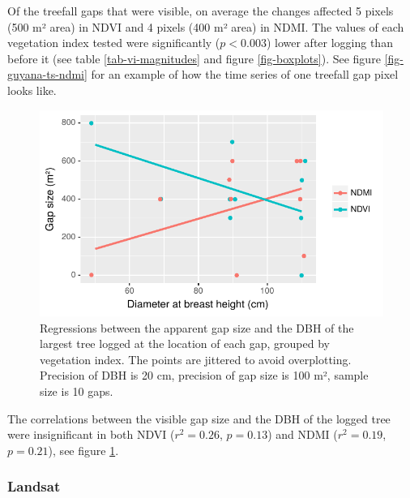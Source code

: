 \documentclass[a4paper,12pt]{scrbook}
\begin{document}
Of the treefall gaps that were visible, on average the changes affected 5 pixels (500 m² area) in NDVI and 4 pixels (400 m² area) in NDMI. The values of each vegetation index tested were significantly ($ p < 0.003 $) lower after logging than before it (see table \ref{tab-vi-magnitudes} and figure \ref{fig-boxplots}). See figure \ref{fig-guyana-ts-ndmi} for an example of how the time series of one treefall gap pixel looks like.

\begin{figure}
  \centering
  \includegraphics{thesis-figures/18-gap-vs-dbh}
  \caption{Regressions between the apparent gap size and the \ac{DBH} of the largest tree logged at the location of each gap, grouped by vegetation index. The points are jittered to avoid overplotting. Precision of \ac{DBH} is 20 cm, precision of gap size is 100 m², sample size is 10 gaps.}
  \label{fig-gap-vs-dbh}
\end{figure}


The correlations between the visible gap size and the \ac{DBH} of the logged tree were insignificant in both NDVI ($r^2=0.26$, $p=0.13$) and NDMI ($r^2=0.19$, $p=0.21$), see figure \ref{fig-gap-vs-dbh}.

\subsubsection{Landsat}
\end{document}
